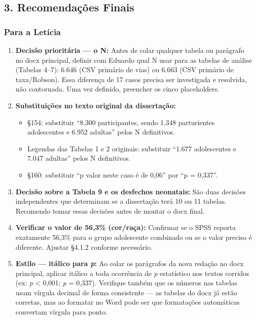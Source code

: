 \documentclass[
]{article}
\providecommand{\tightlist}{%
  \setlength{\itemsep}{0pt}\setlength{\parskip}{0pt}}
\begin{document}
\hypertarget{recomendauxe7uxf5es-finais}{%
\subsection{3. Recomendações Finais}\label{recomendauxe7uxf5es-finais}}

\hypertarget{para-a-letuxedcia}{%
\subsubsection{Para a Letícia}\label{para-a-letuxedcia}}

\begin{enumerate}
\def\labelenumi{\arabic{enumi}.}
\item
  \textbf{Decisão prioritária --- o N:} Antes de colar qualquer tabela
  ou parágrafo no docx principal, definir com Eduardo qual N usar para
  as tabelas de análise (Tabelas 4--7): 6.646 (CSV primário de vias) ou
  6.663 (CSV primário de taxa/Robson). Essa diferença de 17 casos
  precisa ser investigada e resolvida, não contornada. Uma vez definido,
  preencher os cinco placeholders.
\item
  \textbf{Substituições no texto original da dissertação:}

  \begin{itemize}
  \tightlist
  \item
    §154: substituir ``8.300 participantes, sendo 1.348 parturientes
    adolescentes e 6.952 adultas'' pelos N definitivos.
  \item
    Legendas das Tabelas 1 e 2 originais: substituir ``1.677
    adolescentes e 7.047 adultas'' pelos N definitivos.
  \item
    §160: substituir ``p valor neste caso é de 0,06'' por ``p = 0,337''.
  \end{itemize}
\item
  \textbf{Decisão sobre a Tabela 9 e os desfechos neonatais:} São duas
  decisões independentes que determinam se a dissertação terá 10 ou 11
  tabelas. Recomendo tomar essas decisões antes de montar o docx final.
\item
  \textbf{Verificar o valor de 56,3\% (cor/raça):} Confirmar se o SPSS
  reporta exatamente 56,3\% para o grupo adolescente combinado ou se o
  valor preciso é diferente. Ajustar §4.1.2 conforme necessário.
\item
  \textbf{Estilo --- itálico para \emph{p}:} Ao colar os parágrafos da
  nova redação no docx principal, aplicar itálico a toda ocorrência de
  \emph{p} estatístico nos textos corridos (ex: \emph{p} \textless{}
  0,001; \emph{p} = 0,337). Verifique também que os números nas tabelas
  usam vírgula decimal de forma consistente --- as tabelas do docx já
  estão corretas, mas ao formatar no Word pode ser que formatações
  automáticas convertam vírgula para ponto.
\end{enumerate}
\end{document}
